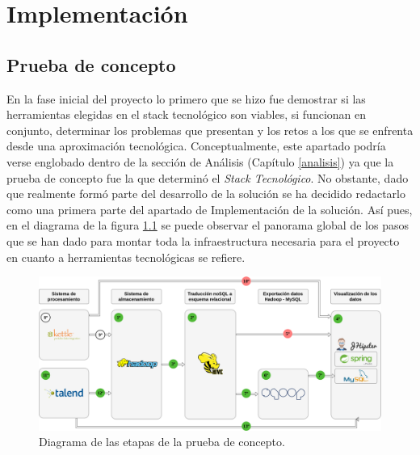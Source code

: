 \chapter{Implementación} \label{implementacion}
\section{Prueba de concepto} \label{implementacion.prueba}

En la fase inicial del proyecto lo primero que se hizo fue demostrar si las herramientas elegidas en el stack tecnológico son viables, si funcionan en conjunto, determinar los problemas que presentan y los retos a los que se enfrenta desde una aproximación tecnológica. Conceptualmente, este apartado podría verse englobado dentro de la sección de Análisis (Capítulo \ref{analisis}) ya que la prueba de concepto fue la que determinó el \textit{Stack Tecnológico}. No obstante, dado que realmente formó parte del desarrollo de la solución se ha decidido redactarlo como una primera parte del apartado de Implementación de la solución. Así pues, en el diagrama de la figura \ref{fig:pruebaconceptoglobal} se puede observar el panorama global de los pasos que se han dado para montar toda la infraestructura necesaria para el proyecto en cuanto a herramientas tecnológicas se refiere. 

\begin{landscape}

\begin{figure}[p!]
    
    \includegraphics[width=\linewidth]{Imagenes/pruebadeconceptoglobal}
    \caption{Diagrama de las etapas de la prueba de concepto.}
    \label{fig:pruebaconceptoglobal}
\end{figure}

\end{landscape}


\par

